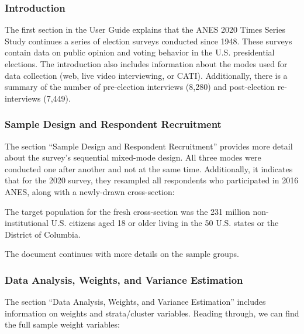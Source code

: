 \documentclass[
]{krantz}
\renewenvironment{quote}{\begin{VF}}{\end{VF}}
\begin{document}
\hypertarget{introduction-2}{%
\subsubsection*{Introduction}\label{introduction-2}}


The first section in the User Guide explains that the ANES 2020 Times Series Study continues a series of election surveys conducted since 1948. These surveys contain data on public opinion and voting behavior in the U.S. presidential elections. The introduction also includes information about the modes used for data collection (web, live video interviewing, or CATI). Additionally, there is a summary of the number of pre-election interviews (8,280) and post-election re-interviews (7,449).

\hypertarget{sample-design-and-respondent-recruitment}{%
\subsubsection*{Sample Design and Respondent Recruitment}\label{sample-design-and-respondent-recruitment}}


The section ``Sample Design and Respondent Recruitment'' provides more detail about the survey's sequential mixed-mode design. All three modes were conducted one after another and not at the same time. Additionally, it indicates that for the 2020 survey, they resampled all respondents who participated in 2016 ANES, along with a newly-drawn cross-section:

\begin{quote}
The target population for the fresh cross-section was the 231 million non-institutional U.S. citizens aged 18 or older living in the 50 U.S. states or the District of Columbia.
\end{quote}

The document continues with more details on the sample groups.

\hypertarget{data-analysis-weights-and-variance-estimation}{%
\subsubsection*{Data Analysis, Weights, and Variance Estimation}\label{data-analysis-weights-and-variance-estimation}}


The section ``Data Analysis, Weights, and Variance Estimation'' includes information on weights and strata/cluster variables. Reading through, we can find the full sample weight variables:
\end{document}
